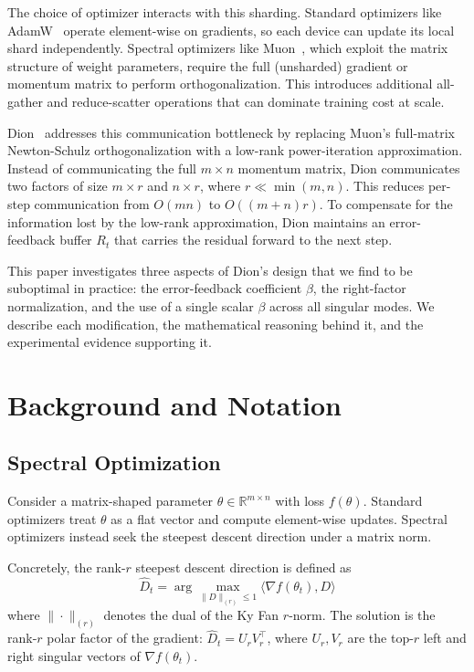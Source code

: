 \documentclass[11pt]{article}
\newcommand{\R}{\mathbb{R}}
\newcommand{\norm}[1]{\|#1\|}
\newcommand{\inner}[2]{\langle #1, #2 \rangle}
\begin{document}
The choice of optimizer interacts with this sharding. Standard optimizers like AdamW~\cite{loshchilov2019decoupled} operate element-wise on gradients, so each device can update its local shard independently. Spectral optimizers like Muon~\cite{jordan2024muon}, which exploit the matrix structure of weight parameters, require the full (unsharded) gradient or momentum matrix to perform orthogonalization. This introduces additional all-gather and reduce-scatter operations that can dominate training cost at scale.

Dion~\cite{ahn2025dion} addresses this communication bottleneck by replacing Muon's full-matrix Newton-Schulz orthogonalization with a low-rank power-iteration approximation. Instead of communicating the full $m \times n$ momentum matrix, Dion communicates two factors of size $m \times r$ and $n \times r$, where $r \ll \min(m,n)$. This reduces per-step communication from $O(mn)$ to $O((m+n)r)$. To compensate for the information lost by the low-rank approximation, Dion maintains an error-feedback buffer $R_t$ that carries the residual forward to the next step.

This paper investigates three aspects of Dion's design that we find to be suboptimal in practice: the error-feedback coefficient $\beta$, the right-factor normalization, and the use of a single scalar $\beta$ across all singular modes. We describe each modification, the mathematical reasoning behind it, and the experimental evidence supporting it.

\section{Background and Notation}
\label{sec:background}

\subsection{Spectral Optimization}

Consider a matrix-shaped parameter $\theta \in \R^{m \times n}$ with loss $f(\theta)$. Standard optimizers treat $\theta$ as a flat vector and compute element-wise updates. Spectral optimizers instead seek the steepest descent direction under a matrix norm.

Concretely, the rank-$r$ steepest descent direction is defined as
\begin{equation}
\hat{D}_t = \arg\max_{\norm{D}_{(r)} \leq 1} \inner{\nabla f(\theta_t)}{D}
\label{eq:lmo}
\end{equation}
where $\norm{\cdot}_{(r)}$ denotes the dual of the Ky Fan $r$-norm. The solution is the rank-$r$ polar factor of the gradient: $\hat{D}_t = U_r V_r^\top$, where $U_r, V_r$ are the top-$r$ left and right singular vectors of $\nabla f(\theta_t)$.
\end{document}
